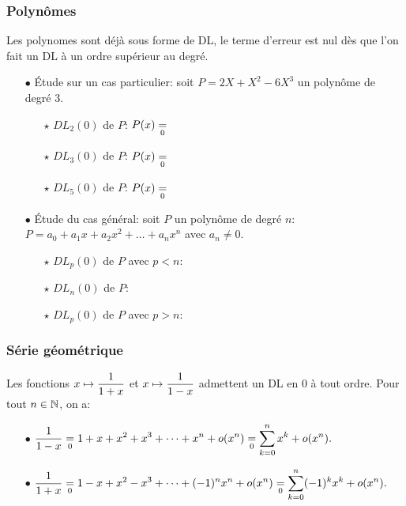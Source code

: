 \documentclass[a4paper, 11pt]{article}
\begin{document}
\subsubsection{Polyn\^{o}mes}
Les polynomes sont déjà sous forme de DL, le terme d'erreur est nul dès que l'on fait un DL à un ordre supérieur au degré. 
\begin{itemize}
\item[$\bullet$] \'Etude sur un cas particulier: soit $P=2X+X^2-6X^3$ un polyn\^{o}me de degr\'e 3.
\begin{itemize}
\item[$\star$] $DL_2(0)$ de $P$: $P(x)\underset{0}{=}\dotfill$\vsec
\item[$\star$] $DL_3(0)$ de $P$: $P(x)\underset{0}{=}\dotfill$\vsec
\item[$\star$] $DL_5(0)$ de $P$: $P(x)\underset{0}{=}\dotfill$\vsec
\end{itemize}
\item[$\bullet$] \'Etude du cas g\'en\'eral: soit $P$ un polyn\^{o}me de degr\'e $n$: $P=a_0+a_1x+a_2x^2+\dots+a_nx^n$ avec $a_n\not= 0$.\vsec
\begin{itemize}
\item[$\star$] $DL_p(0)$ de $P$ avec $p<n$:
\item[$\star$] $DL_n(0)$ de $P$:
\item[$\star$]  $DL_p(0)$ de $P$ avec $p>n :$
\end{itemize}
\end{itemize}
\vspace{0.3cm}


\subsubsection{Série géométrique}


\begin{prop} 
Les fonctions $x\mapsto \displaystyle\frac{1}{1+x}$ et $x\mapsto \displaystyle\frac{1}{1-x}$ admettent un DL en 0 \`a tout ordre. Pour tout $n\in\mathbb{N}$, on a:
\begin{itemize}
\item[$\bullet$] $\displaystyle\frac{1}{1-x}\underset{0}{=}1+x+x^2+x^3+\dots+x^n+o(x^n)\underset{0}{=}\sum\limits_{k=0}^n x^k+o(x^n).$
\item[$\bullet$]  $\displaystyle\frac{1}{1+x}\underset{0}{=}1-x+x^2-x^3+\dots+(-1)^nx^n+o(x^n)\underset{0}{=}\sum\limits_{k=0}^n (-1)^kx^k+o(x^n).$
\end{itemize}
\end{prop}
 
\end{document}
